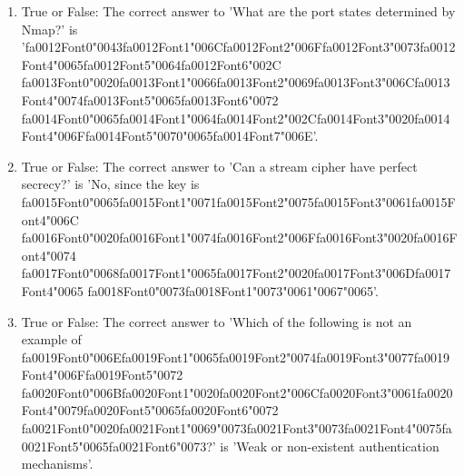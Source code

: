 \documentclass[12pt]{article}
\begin{document}
\begin{enumerate}[label=\arabic*.]
\item True or False: The correct answer to 'What are the port states determined by Nmap?' is '{\csname fa0012Font0\endcsname\char"0043}{\csname fa0012Font1\endcsname\char"006C}{\csname fa0012Font2\endcsname\char"006F}{\csname fa0012Font3\endcsname\char"0073}{\csname fa0012Font4\endcsname\char"0065}{\csname fa0012Font5\endcsname\char"0064}{\csname fa0012Font6\endcsname\char"002C} {\csname fa0013Font0\endcsname\char"0020}{\csname fa0013Font1\endcsname\char"0066}{\csname fa0013Font2\endcsname\char"0069}{\csname fa0013Font3\endcsname\char"006C}{\csname fa0013Font4\endcsname\char"0074}{\csname fa0013Font5\endcsname\char"0065}{\csname fa0013Font6\endcsname\char"0072} {\csname fa0014Font0\endcsname\char"0065}{\csname fa0014Font1\endcsname\char"0064}{\csname fa0014Font2\endcsname\char"002C}{\csname fa0014Font3\endcsname\char"0020}{\csname fa0014Font4\endcsname\char"006F}{\csname fa0014Font5\endcsname\char"0070}{\char"0065}{\csname fa0014Font7\endcsname\char"006E}'.
\item True or False: The correct answer to 'Can a stream cipher have perfect secrecy?' is 'No, since the key is {\csname fa0015Font0\endcsname\char"0065}{\csname fa0015Font1\endcsname\char"0071}{\csname fa0015Font2\endcsname\char"0075}{\csname fa0015Font3\endcsname\char"0061}{\csname fa0015Font4\endcsname\char"006C} {\csname fa0016Font0\endcsname\char"0020}{\csname fa0016Font1\endcsname\char"0074}{\csname fa0016Font2\endcsname\char"006F}{\csname fa0016Font3\endcsname\char"0020}{\csname fa0016Font4\endcsname\char"0074} {\csname fa0017Font0\endcsname\char"0068}{\csname fa0017Font1\endcsname\char"0065}{\csname fa0017Font2\endcsname\char"0020}{\csname fa0017Font3\endcsname\char"006D}{\csname fa0017Font4\endcsname\char"0065} {\csname fa0018Font0\endcsname\char"0073}{\csname fa0018Font1\endcsname\char"0073}{\char"0061}{\char"0067}{\char"0065}'.
\item True or False: The correct answer to 'Which of the following is not an example of {\csname fa0019Font0\endcsname\char"006E}{\csname fa0019Font1\endcsname\char"0065}{\csname fa0019Font2\endcsname\char"0074}{\csname fa0019Font3\endcsname\char"0077}{\csname fa0019Font4\endcsname\char"006F}{\csname fa0019Font5\endcsname\char"0072} {\csname fa0020Font0\endcsname\char"006B}{\csname fa0020Font1\endcsname\char"0020}{\csname fa0020Font2\endcsname\char"006C}{\csname fa0020Font3\endcsname\char"0061}{\csname fa0020Font4\endcsname\char"0079}{\csname fa0020Font5\endcsname\char"0065}{\csname fa0020Font6\endcsname\char"0072} {\csname fa0021Font0\endcsname\char"0020}{\csname fa0021Font1\endcsname\char"0069}{\char"0073}{\csname fa0021Font3\endcsname\char"0073}{\csname fa0021Font4\endcsname\char"0075}{\csname fa0021Font5\endcsname\char"0065}{\csname fa0021Font6\endcsname\char"0073}?' is 'Weak or non-existent authentication mechanisms'.

\end{enumerate}
\end{document}
